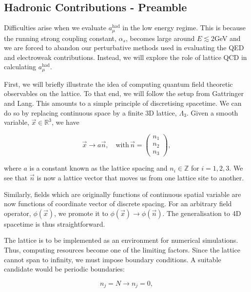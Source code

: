 \documentclass{article}
\numberwithin{equation}{section} %
\begin{document}
\subsection{Hadronic Contributions - Preamble}

Difficulties arise when we evaluate $a_\mu^\mathrm{had}$ in the low energy regime. This is because the running strong coupling constant, $\alpha_s$, becomes large around $E\lesssim2$GeV\cite{lehnerg2} and we are forced to abandon our perturbative methods used in evaluating the QED and electroweak contributions. Instead, we will explore the role of lattice QCD in calculating $a_\mu^\mathrm{had}$. 

First, we will briefly illustrate the idea of computing quantum field theoretic observables on the lattice. To that end, we will follow the setup from Gattringer and Lang\cite{lattice}. This amounts to a simple principle of discretising spacetime. We can do so by replacing continuous space by a finite 3D lattice, $\Lambda_3$. Given a smooth variable, $\vec{x}\in\mathbb{R}^3$, we have

\begin{equation}
\vec{x} \rightarrow a \vec{n}, \quad \mathrm{with } \, \vec{n} = \begin{pmatrix}
n_1 \\ n_2 \\ n_3
\end{pmatrix},
\end{equation}

\noindent where $a$ is a constant known as the lattice spacing and $n_i\in\mathbb{Z}$ for $i=1,2,3$. We see that $\vec{n}$ is now a lattice vector that moves us from one lattice site to another. 

Similarly, fields which are originally functions of continuous spatial variable are now functions of coordinate vector of discrete spacing. For an arbitrary field operator, $\phi(\vec{x})$, we promote it to $\phi(\vec{x}) \rightarrow \phi(\vec{n})$. The generalisation to 4D spacetime is thus straightforward.

The lattice is to be implemented as an environment for numerical simulations. Thus, computing resources become one of the limiting factors. Since the lattice cannot span to infinity, we must impose boundary conditions. A suitable candidate would be periodic boundaries:

\begin{equation}
n_j=N \rightarrow n_j=0,
\end{equation}
\end{document}
